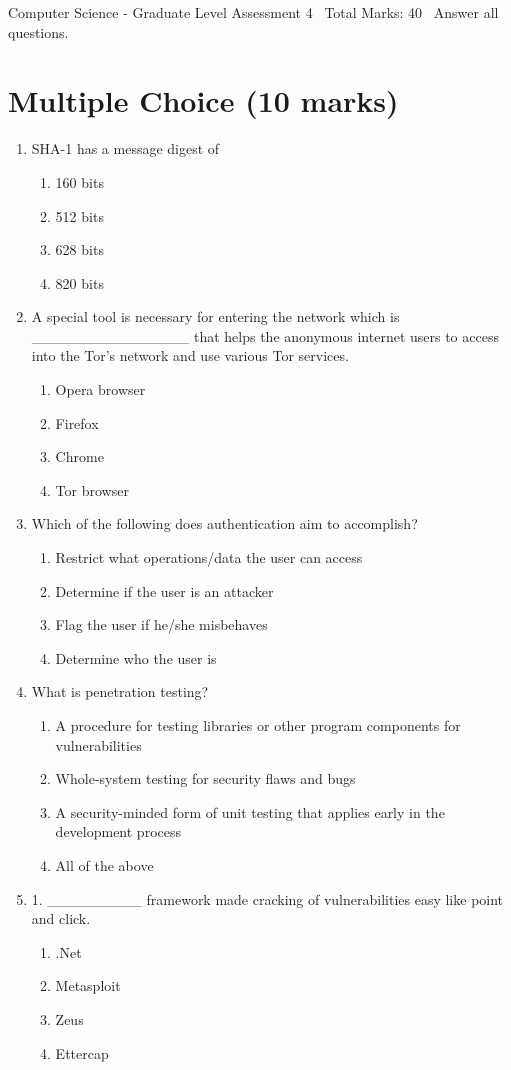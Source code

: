 \documentclass[12pt]{article}
\begin{document}
\begin{center}
Computer Science - Graduate Level Assessment 4 \
Total Marks: 40 \
Answer all questions.
\end{center}

\section*{Multiple Choice (10 marks)}
\begin{enumerate}[label=\arabic*.]
\item SHA-1 has a message digest of
\begin{enumerate}[label=(\alph*)]
    \item 160 bits
    \item 512 bits
    \item 628 bits
    \item 820 bits
\end{enumerate}
\item A special tool is necessary for entering the network which is \_\_\_\_\_\_\_\_\_\_\_\_\_\_\_ that helps the anonymous internet users to access into the Tor's network and use various Tor services.
\begin{enumerate}[label=(\alph*)]
    \item Opera browser
    \item Firefox
    \item Chrome
    \item Tor browser
\end{enumerate}
\item Which of the following does authentication aim to accomplish?
\begin{enumerate}[label=(\alph*)]
    \item Restrict what operations/data the user can access
    \item Determine if the user is an attacker
    \item Flag the user if he/she misbehaves
    \item Determine who the user is
\end{enumerate}
\item What is penetration testing?
\begin{enumerate}[label=(\alph*)]
    \item A procedure for testing libraries or other program components for vulnerabilities
    \item Whole-system testing for security flaws and bugs
    \item A security-minded form of unit testing that applies early in the development process
    \item All of the above
\end{enumerate}
\item 1. \_\_\_\_\_\_\_\_\_ framework made cracking of vulnerabilities easy like point and click.
\begin{enumerate}[label=(\alph*)]
    \item .Net
    \item Metasploit
    \item Zeus
    \item Ettercap
\end{enumerate}
\end{enumerate}
\end{document}
